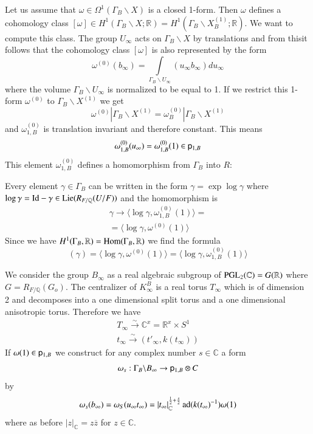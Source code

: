 Let us assume that $\omega\in\Omega^{1}(\Gamma_{B}\backslash X)$ is a closed 1-form. Then $\omega$ defines a cohomology class $[\omega]\in H^{1}(\Gamma_{B}\backslash X;\mathbb{R})=H^{1}(\Gamma_{B}\backslash X_{B}^{(1)};\mathbb{R})$. We want to compute this class. The group $U_{\infty}$ acts on $\Gamma_{B}\backslash X$ by translations and from this\pageoriginale it follows that the cohomology class $[\omega]$ is also represented by the form
$$
\omega^{(0)}(b_{\infty})=\int\limits_{\Gamma_{B}\backslash U_{\infty}}(u_{\infty}b_{\infty})du_{\infty}
$$
where the volume $\Gamma_{B}\backslash U_{\infty}$ is normalized to be equal to 1. If we restrict this 1-form $\omega^{(0)}$ to $\Gamma_{B}\backslash X^{(1)}$ we get
$$
\omega^{(0)}\left| \Gamma_{B}\backslash X^{(1)}=\omega^{(0)}_{B}\right| \Gamma_{B}\backslash X^{(1)}
$$
and $\omega^{(0)}_{1,B}$ is translation invariant and therefore constant. This means
$$
\omega^{(0)}_{1,B}(u_{\infty})=\omega^{(0)}_{1,B}(1)\in \mathsf{p}_{1,B}
$$
This element $\omega^{(0)}_{1,B}$ defines a homomorphism from $\Gamma_{B}$ into $R$:

Every element $\gamma\in \Gamma_{B}$ can be written in the form $\gamma=\exp \log \gamma$ where $\log\gamma=\mathrm{Id}-\gamma\in \operatorname{Lie} (R_{F/\mathbb{Q}}(U/F))$ and the homomorphism is
\begin{gather*}
\gamma\to \langle \log \gamma,\omega_{1,B}^{(0)}(1)\rangle =\\
=\langle \log \gamma, \omega^{(0)}(1)\rangle
\end{gather*}
Since we have $H^{1}(\Gamma_{B},\mathbb{R})=\operatorname{Hom}(\Gamma_{B},\mathbb{R})$ we find the formula
\setcounter{equation}{0}
\begin{equation}
[\omega](\gamma)=\langle \log \gamma,\omega^{(0)}(1)\rangle=\langle\log \gamma,\omega^{(0)}_{1,B}(1)\rangle\label{art2-eq1.5.1}
\end{equation}

We consider the group $B_{\infty}$ as a real algebraic subgroup of $\mathrm{PGL}_{2}(\mathbb{C})=G(\mathbb{R})$ where $G=R_{F/\mathbb{Q}}(G_{o})$. The centralizer of $K^{B}_{\infty}$ is a real torus $T_{\infty}$ which is of dimension 2 and decomposes into a one dimensional split torus and a one dimensional anisotropic torus. Therefore we have
\begin{gather*}
T_{\infty}\xrightarrow{\sim}\mathbb{C}^{x}=\mathbb{R}^{x}\times S^{1}\\
t_{\infty}\xrightarrow{\sim}(t'_{\infty},k(t_{\infty}))
\end{gather*}
If $\omega(1)\in \mathsf{p}_{1,B}$ we construct for any complex number $s\in \mathbb{C}$ a form
$$
\omega_{s}:\Gamma_{B}\backslash B_{\infty}\to \mathsf{p}_{1,B}\otimes C
$$
by
$$
\omega_{s}(b_{\infty})=\omega_{S}(u_{\infty}t_{\infty})=|t_{\infty}|^{\frac{1}{2}+\frac{s}{2}}_{\mathbb{C}}\operatorname{ad}(k(t_{\infty})^{-1})\omega(1)
$$
where as before $|z|_{\mathbb{C}}=z\overline{z}$ for $z\in \mathbb{C}$.

